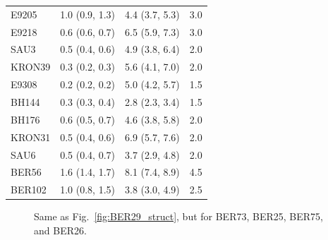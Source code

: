 \documentclass{aa}
\begin{document}
\begin{appendix}
\begin{table}[h!]
\begin{tabular}{llll}
  E9205         & 1.0 (0.9, 1.3) &  4.4 (3.7, 5.3) &  3.0\\
  E9218         & 0.6 (0.6, 0.7) &  6.5 (5.9, 7.3) &  3.0\\
  SAU3          & 0.5 (0.4, 0.6) &  4.9 (3.8, 6.4) &  2.0\\
  KRON39        & 0.3 (0.2, 0.3) &  5.6 (4.1, 7.0) &  2.0\\
  E9308         & 0.2 (0.2, 0.2) &  5.0 (4.2, 5.7) &  1.5\\
  BH144         & 0.3 (0.3, 0.4) &  2.8 (2.3, 3.4) &  1.5\\
  BH176         & 0.6 (0.5, 0.7) &  4.6 (3.8, 5.8) &  2.0\\
  KRON31        & 0.5 (0.4, 0.6) &  6.9 (5.7, 7.6) &  2.0\\
  SAU6          & 0.5 (0.4, 0.7) &  3.7 (2.9, 4.8) &  2.0\\
  BER56         & 1.6 (1.4, 1.7) &  8.1 (7.4, 8.9) &  4.5\\
  BER102        & 1.0 (0.8, 1.5) &  3.8 (3.0, 4.9) &  2.5\\
 \hline
 \end{tabular}
 \end{table}

 \begin{figure}
  \caption{Same as Fig.~\ref{fig:BER29_struct}, but  for BER73, BER25, BER75, and BER26.}
  \label{fig:0struct}
 \end{figure}


\end{appendix}
\end{document}
